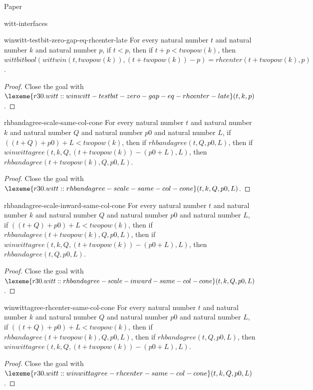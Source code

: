\begin{lexlean}{Paper}
\begin{section}{witt-interfaces}
  \begin{theorem}{winwitt-testbit-zero-gap-eq-rhcenter-late}
  For every natural number \(t\) and natural number \(k\) and natural number \(p\), if \(t < p\), then if \(t + p < twopow(k)\), then \(wittbitbool(wittwin(t, twopow(k)), (t + twopow(k)) - p) = rhcenter(t + twopow(k), p)\).
  \begin{proof}
  Close the goal with \(\lexeme{r30.witt::winwitt-testbit-zero-gap-eq-rhcenter-late}(t, k, p)\).
  \end{proof}
  \end{theorem}

  \begin{theorem}{rhbandagree-scale-same-col-cone}
  For every natural number \(t\) and natural number \(k\) and natural number \(Q\) and natural number \(p0\) and natural number \(L\), if \(((t + Q) + p0) + L < twopow(k)\), then if \(rhbandagree(t, Q, p0, L)\), then if \(winwittagree(t, k, Q, (t + twopow(k)) - (p0 + L), L)\), then \(rhbandagree(t + twopow(k), Q, p0, L)\).
  \begin{proof}
  Close the goal with \(\lexeme{r30.witt::rhbandagree-scale-same-col-cone}(t, k, Q, p0, L)\).
  \end{proof}
  \end{theorem}

  \begin{theorem}{rhbandagree-scale-inward-same-col-cone}
  For every natural number \(t\) and natural number \(k\) and natural number \(Q\) and natural number \(p0\) and natural number \(L\), if \(((t + Q) + p0) + L < twopow(k)\), then if \(rhbandagree(t + twopow(k), Q, p0, L)\), then if \(winwittagree(t, k, Q, (t + twopow(k)) - (p0 + L), L)\), then \(rhbandagree(t, Q, p0, L)\).
  \begin{proof}
  Close the goal with \(\lexeme{r30.witt::rhbandagree-scale-inward-same-col-cone}(t, k, Q, p0, L)\).
  \end{proof}
  \end{theorem}

  \begin{theorem}{winwittagree-rhcenter-same-col-cone}
  For every natural number \(t\) and natural number \(k\) and natural number \(Q\) and natural number \(p0\) and natural number \(L\), if \(((t + Q) + p0) + L < twopow(k)\), then if \(rhbandagree(t + twopow(k), Q, p0, L)\), then if \(rhbandagree(t, Q, p0, L)\), then \(winwittagree(t, k, Q, (t + twopow(k)) - (p0 + L), L)\).
  \begin{proof}
  Close the goal with \(\lexeme{r30.witt::winwittagree-rhcenter-same-col-cone}(t, k, Q, p0, L)\).
  \end{proof}
  \end{theorem}


\end{section}
\end{lexlean}
